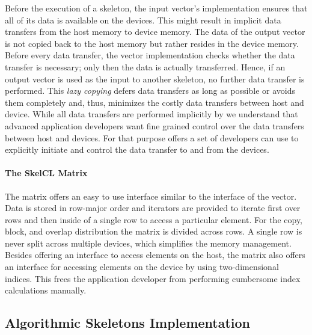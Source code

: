 Before the execution of a skeleton, the input vector's implementation ensures that all of its data is available on the devices.
This might result in implicit data transfers from the host memory to device memory.
The data of the output vector is not copied back to the host memory but rather resides in the device memory.
Before every data transfer, the vector implementation checks whether the data transfer is necessary;
only then the data is actually transferred.
Hence, if an output vector is used as the input to another skeleton, no further data transfer is performed.
This \emph{lazy copying} defers data transfers as long as possible or avoids them completely and, thus, minimizes the costly data transfers between host and device.
While all data transfers are performed implicitly by \SkelCL we understand that advanced application developers want fine grained control over the data transfers between host and devices.
For that purpose \SkelCL offers a set of \APIs developers can use to explicitly initiate and control the data transfer to and from the devices.


\paragraph{The SkelCL Matrix}
The \SkelCL matrix offers an easy to use interface similar to the interface of the vector.
Data is stored in row-major order and iterators are provided to iterate first over rows and then inside of a single row to access a particular element.
For the copy, block, and overlap distribution the matrix is divided across rows.
A single row is never split across multiple devices, which simplifies the memory management.
Besides offering an interface to access elements on the host, the matrix also offers an interface for accessing elements on the device by using two-dimensional indices.
This frees the application developer from performing cumbersome index calculations manually.

\subsection{Algorithmic Skeletons Implementation}
\label{section:skelcl-library:skeletons}


